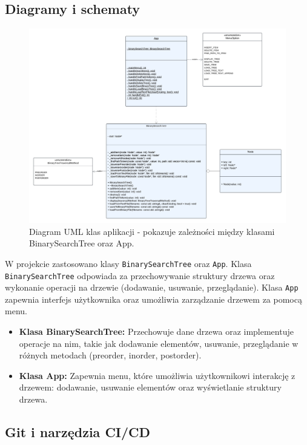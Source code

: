 \newpage

\subsection{Diagramy i schematy}

\begin{figure}[htb!]
	\centering
	\includegraphics[width=\textwidth]{rys/uml_diagram.png}
	\caption{Diagram UML klas aplikacji - pokazuje zależności między klasami BinarySearchTree oraz App.}
	\label{fig:uml_diagram}
\end{figure}

W projekcie zastosowano klasy \texttt{BinarySearchTree} oraz \texttt{App}. Klasa \texttt{BinarySearchTree} odpowiada za przechowywanie struktury drzewa oraz wykonanie operacji na drzewie (dodawanie, usuwanie, przeglądanie). Klasa \texttt{App} zapewnia interfejs użytkownika oraz umożliwia zarządzanie drzewem za pomocą menu.

\begin{itemize}
	\item \textbf{Klasa BinarySearchTree:} Przechowuje dane drzewa oraz implementuje operacje na nim, takie jak dodawanie elementów, usuwanie, przeglądanie w różnych metodach (preorder, inorder, postorder).
	\item \textbf{Klasa App:} Zapewnia menu, które umożliwia użytkownikowi interakcję z drzewem: dodawanie, usuwanie elementów oraz wyświetlanie struktury drzewa.
\end{itemize}

\newpage

\subsection{Git i narzędzia CI/CD}

